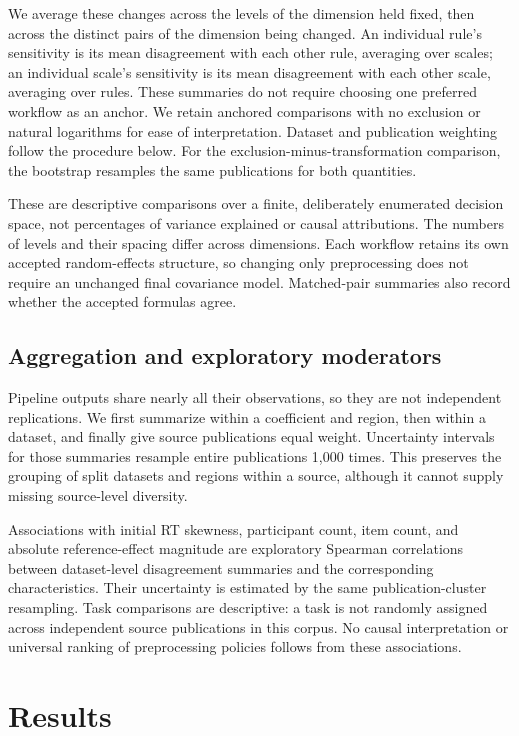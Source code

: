 We average these changes across the levels of the dimension held fixed,
then across the distinct pairs of the dimension being changed. An
individual rule's sensitivity is its mean disagreement with each other
rule, averaging over scales; an individual scale's sensitivity is its
mean disagreement with each other scale, averaging over rules. These
summaries do not require choosing one preferred workflow as an anchor.
We retain anchored comparisons with no exclusion or natural logarithms
for ease of interpretation. Dataset and publication weighting follow
the procedure below. For the exclusion-minus-transformation comparison,
the bootstrap resamples the same publications for both quantities.

These are descriptive comparisons over a finite, deliberately enumerated
decision space, not percentages of variance explained or causal
attributions. The numbers of levels and their spacing differ across
dimensions. Each workflow retains its own accepted random-effects
structure, so changing only preprocessing does not require an unchanged
final covariance model. Matched-pair summaries also record whether the
accepted formulas agree.

\subsection{Aggregation and exploratory moderators}

Pipeline outputs share nearly all their observations, so they are not
independent replications. We first summarize within a coefficient and
region, then within a dataset, and finally give source publications equal
weight. Uncertainty intervals for those summaries resample entire
publications 1,000 times. This preserves the grouping of split datasets and
regions within a source, although it cannot supply missing source-level
diversity.

Associations with initial RT skewness, participant count, item count, and
absolute reference-effect magnitude are
exploratory Spearman correlations between dataset-level disagreement
summaries and the corresponding characteristics. Their uncertainty is
estimated by the same publication-cluster resampling. Task comparisons are
descriptive: a task is not randomly assigned across independent source
publications in this corpus. No causal interpretation or universal ranking
of preprocessing policies follows from these associations.

\section{Results}


